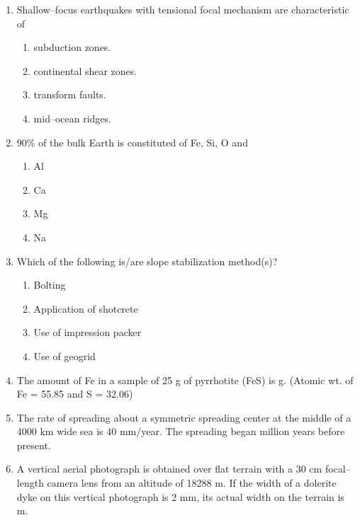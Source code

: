 \documentclass[journal,12pt,onecolumn]{IEEEtran}
\theoremstyle{remark}
\begin{document}
\begin{enumerate}
\item Shallow--focus earthquakes with tensional focal mechanism are characteristic of
\begin{enumerate}
\item subduction zones.
\item continental shear zones.
\item transform faults.
\item mid--ocean ridges.
\end{enumerate}
\vspace{0.5cm}

\item 90\% of the bulk Earth is constituted of Fe, Si, O and
\begin{enumerate}
\item Al
\item Ca
\item Mg
\item Na
\end{enumerate}
\vspace{0.5cm}

\item Which of the following is/are slope stabilization method(s)?
\begin{enumerate}
\item Bolting
\item Application of shotcrete
\item Use of impression packer
\item Use of geogrid
\end{enumerate}
\vspace{0.5cm}

\item The amount of Fe in a sample of 25 g of pyrrhotite (FeS) is \underline{\hspace{10mm}} g. (Atomic wt. of Fe = 55.85 and S = 32.06)
\vspace{0.5cm}

\item The rate of spreading about a symmetric spreading center at the middle of a 4000 km wide sea is 40 mm/year. The spreading began \underline{\hspace{10mm}} million years before present.
\vspace{0.5cm}

\item A vertical aerial photograph is obtained over flat terrain with a 30 cm focal--length camera lens from an altitude of 18288 m. If the width of a dolerite dyke on this vertical photograph is 2 mm, its actual width on the terrain is \underline{\hspace{10mm}} m.
\vspace{0.5cm}


\end{enumerate}
\end{document}
